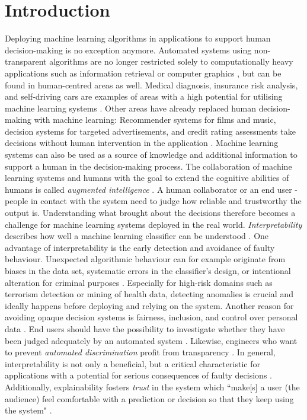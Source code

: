 \section{Introduction}
\label{sec:intro}
Deploying machine learning algorithms in applications to support human decision-making is no exception anymore. Automated systems using non-transparent algorithms are no longer restricted solely to computationally heavy applications such as information retrieval or computer graphics \cite{liu2017towards}, but can be found in human-centred areas as well. Medical diagnosis, insurance risk analysis, and self-driving cars are examples of areas with a high potential for utilising machine learning systems \cite{guidotti2018survey}. Other areas have already replaced human decision-making with machine learning: Recommender systems for films and music, decision systems for targeted advertisements, and credit rating assessments take decisions without human intervention in the application \cite{gilpin2018explaining}. Machine learning systems can also be used as a source of knowledge and additional information to support a human in the decision-making process. The collaboration of machine learning systems and humans with the goal to extend the cognitive abilities of humans is called \textit{augmented intelligence} \cite{ventocilla2018taxonomy}.\newline
A human collaborator or an end user - people in contact with the system need to judge how reliable and trustworthy the output is. Understanding what brought about the decisions therefore becomes a challenge for machine learning systems deployed in the real world. \textit{Interpretability} describes how well a machine learning classifier can be understood \cite{kotsiantis2007supervised}. One advantage of interpretability is the early detection and avoidance of faulty behaviour. Unexpected algorithmic behaviour can for example originate from biases in the data set, systematic errors in the classifier's design, or intentional alteration for criminal purposes \cite{gilpin2018explaining}. Especially for high-risk domains such as terrorism detection or mining of health data, detecting anomalies is crucial \cite{ribeiro2016should} and ideally happens before deploying and relying on the system. Another reason for avoiding opaque decision systems is fairness, inclusion, and control over personal data \cite{diakopoulos2016accountability, gilpin2018explaining, goodman16eu}. End users should have the possibility to investigate whether they have been judged adequately by an automated system \cite{selbst2017meaningful}. Likewise, engineers who want to prevent \textit{automated discrimination} profit from transparency \cite{ribeiro2016should, richardson2018survey}. In general, interpretability is not only a beneficial, but a critical characteristic for applications with a potential for serious consequences of faulty decisions \cite{richardson2018survey}. Additionally, explainability fosters \textit{trust} in the system  \cite{biran2017explanation, cramer2008effects, diakopoulos2016accountability, preece2018asking, vorm2018assessing} which ``make[s] a user (the audience) feel comfortable with a prediction or decision so that they keep using the system" \cite{van2001perceived}.\newline
